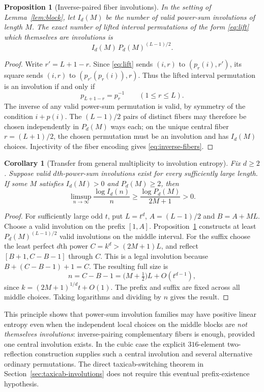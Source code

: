 \documentclass[10pt]{article}
\newtheorem{proposition}{Proposition}
\newtheorem{corollary}{Corollary}
\begin{document}
\begin{proposition}[Inverse-paired fiber involutions]
\label{prop:inverse-fibers}
In the setting of
Lemma~\ref{lem:block},
let $I_d(M)$ be the number of
valid power-sum involutions of length
$M$. The exact number of lifted
interval permutations of the form
\eqref{eq:lift} which themselves
are involutions is
\begin{equation}\label{eq:inverse-fibers}
\boxed{\displaystyle
I_d(M)\,P_d(M)^{(L-1)/2}.}
\end{equation}
\end{proposition}
\begin{proof}
Write $r'=L+1-r$. Since
\eqref{eq:lift} sends $(i,r)$
to $(p_r(i),r')$, its square sends
$(i,r)$ to
$(p_{r'}(p_r(i)),r)$.
Thus the lifted interval permutation
is an involution if and only if
\[
p_{L+1-r}=p_r^{-1}
\qquad(1\le r\le L).
\]
The inverse of any valid power-sum
permutation is valid, by symmetry
of the condition $i+p(i)$.
The $(L-1)/2$ pairs of distinct
fibers may therefore be chosen
independently in $P_d(M)$ ways
each; on the unique central fiber
$r=(L+1)/2$, the chosen
permutation must be an involution
and has $I_d(M)$ choices.
Injectivity of the fiber encoding
gives \eqref{eq:inverse-fibers}.
\end{proof}

\begin{corollary}[Transfer from general multiplicity to involution entropy]
\label{cor:inverse-transfer}
Fix $d\ge2$. Suppose valid
$d$th-power-sum involutions exist
for every sufficiently large length.
If some $M$ satisfies
$I_d(M)>0$ and $P_d(M)\ge2$,
then
\[
\boxed{\displaystyle
\limsup_{n\to\infty}
\frac{\log I_d(n)}n
\ge\frac{\log P_d(M)}{2M+1}>0.}
\]
\end{corollary}
\begin{proof}
For sufficiently large odd $t$,
put $L=t^d$, $A=(L-1)/2$
and $B=A+ML$. Choose a
valid involution on the prefix
$[1,A]$. Proposition~\ref{prop:inverse-fibers}
constructs at least
$P_d(M)^{(L-1)/2}$ valid involutions
on the middle interval.
For the suffix choose the least
perfect $d$th power
$C=k^d>(2M+1)L$, and reflect
$[B+1,C-B-1]$ through $C$.
This is a legal involution because
$B+(C-B-1)+1=C$.
The resulting full size is
\[
n=C-B-1
=\bigl(M+\tfrac12\bigr)L
 +O(t^{d-1}),
\]
since $k=(2M+1)^{1/d}t+O(1)$.
The prefix and suffix are fixed
across all middle choices.
Taking logarithms and dividing
by $n$ gives the result.
\end{proof}

This principle shows that
power-sum involution families
may have positive linear entropy
even when the independent local
choices on the middle blocks are
\emph{not themselves involutions}:
inverse-pairing complementary fibers
is enough, provided one central
involution exists.
In the cubic case the explicit
$316$-element two-reflection
construction supplies such a
central involution and several
alternative ordinary permutations.
The direct taxicab-switching theorem
in Section~\ref{sec:taxicab-involutions}
does not require this eventual
prefix-existence hypothesis.
\end{document}

